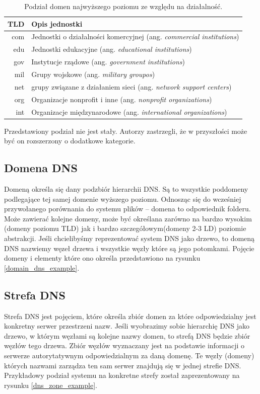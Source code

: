 \begin{table}[]
	\centering
	\caption{Podział domen najwyższego poziomu ze względu na działalność.}
	\label{podzial_tld}
	\begin{tabular}{|r|p{10.5cm}|}
		\hline
		\textbf{TLD} & \textbf{Opis jednostki} \\
		\hline\hline
		com & Jednostki o działalności komercyjnej (ang. \textit{commercial institutions}) \\
		\hline
		edu & Jednostki edukacyjne (ang. \textit{educational institutions})\\
		\hline
		gov & Instytucje rządowe (ang. \textit{government institutions}) \\
		\hline
		mil & Grupy wojskowe (ang. \textit{military groupos}) \\
		\hline
		net & grupy związane z działaniem sieci (ang. \textit{network support centers}) \\
		\hline
		org & Organizacje nonprofit i inne (ang. \textit{nonprofit organizations}) \\
		\hline
		int & Organizacje międzynarodowe (ang. \textit{international organizations}) \\
		\hline
	\end{tabular}
\end{table}

Przedstawiony podział nie jest stały. Autorzy zastrzegli, że w przyszłości może być on rozszerzony o dodatkowe kategorie.

\subsection{Domena DNS}
Domeną określa się dany podzbiór hierarchii DNS. Są to wszystkie poddomeny podlegające tej samej domenie wyższego poziomu. Odnosząc się do wcześniej przywołanego porównania do systemu plików -- domena to odpowiednik folderu. Może zawierać kolejne domeny, może być określana zarówno na bardzo wysokim (domeny poziomu TLD) jak i bardzo szczegółowym(domeny 2-3 LD) poziomie abstrakcji. Jeśli chcielibyśmy reprezentować system DNS jako drzewo, to domeną DNS nazwiemy węzeł drzewa i wszystkie węzły które są jego potomkami. Pojęcie domeny i elementy które ono określa przedstawiono na rysunku \ref{domain_dns_example}.

\subsection{Strefa DNS}
Strefa DNS jest pojęciem, które określa zbiór domen za które odpowiedzialny jest konkretny serwer przestrzeni nazw. Jeśli wyobrazimy sobie hierarchię DNS jako drzewo, w którym węzłami są kolejne nazwy domen, to strefą DNS będzie zbiór węzłów tego drzewa. Zbiór węzłów wyznaczany jest na podstawie informacji o serwerze autorytatywnym odpowiedzialnym za daną domenę. Te węzły (domeny) których nazwami zarządza ten sam serwer znajdują się w jednej strefie DNS. Przykładowy podział systemu na konkretne strefy został zaprezentowany na rysunku \ref{dns_zone_example}.

